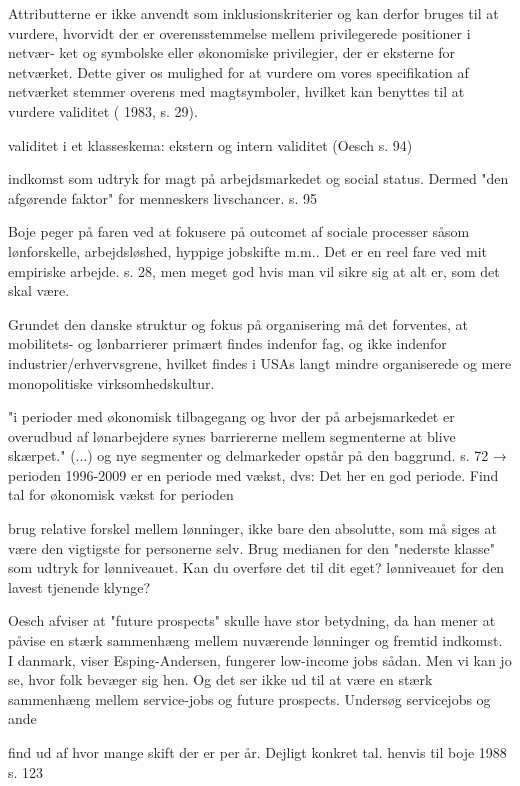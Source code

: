 Attributterne er ikke anvendt som inklusionskriterier og kan derfor bruges til at
vurdere, hvorvidt der er overensstemmelse mellem privilegerede positioner i netvær-
ket og symbolske eller økonomiske privilegier, der er eksterne for netværket. Dette giver
os mulighed for at vurdere om vores specifikation af netværket stemmer overens med
magtsymboler, hvilket kan benyttes til at vurdere validitet ( 1983, s. 29).


validitet i et klasseskema: ekstern og intern validitet (Oesch s. 94)

indkomst som udtryk for magt på arbejdsmarkedet og social status. Dermed "den afgørende faktor" for menneskers livschancer. s. 95

Boje peger på faren ved at fokusere på outcomet af sociale processer såsom lønforskelle, arbejdsløshed, hyppige jobskifte m.m.. Det er en reel fare ved mit empiriske arbejde. s. 28, men meget god hvis man vil sikre sig at alt er, som det skal være. 

Grundet den danske struktur og fokus på organisering må det forventes, at mobilitets- og lønbarrierer primært findes indenfor fag, og ikke indenfor industrier/erhvervsgrene, hvilket findes i USAs langt mindre organiserede og mere monopolitiske virksomhedskultur. 

"i perioder med økonomisk tilbagegang og hvor der på arbejsmarkedet er overudbud af lønarbejdere synes barriererne mellem segmenterne at blive skærpet." (...) og nye segmenter og delmarkeder opstår på den baggrund. s. 72
→ perioden 1996-2009 er en periode med vækst, dvs: Det her en god periode. Find tal for økonomisk vækst for perioden


brug relative forskel mellem lønninger, ikke bare den absolutte, som må siges at være den vigtigste for personerne selv. Brug medianen for den "nederste klasse" som udtryk for lønniveauet. Kan du overføre det til dit eget? lønniveauet for den lavest tjenende klynge?

Oesch afviser at "future prospects" skulle have stor betydning, da han mener at påvise en stærk sammenhæng mellem nuværende lønninger og fremtid indkomst. I danmark, viser Esping-Andersen, fungerer low-income jobs sådan. Men vi kan jo se, hvor folk bevæger sig hen. Og det ser ikke ud til at være en stærk sammenhæng mellem service-jobs og future prospects. Undersøg servicejobs og ande


find ud af hvor mange skift der er per år. Dejligt konkret tal. henvis til boje 1988 s. 123


